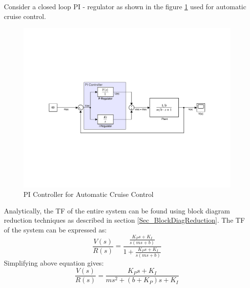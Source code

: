 Consider a closed loop PI - regulator as shown in the figure \ref{Fig_PI_Control_CruiseControl} used for automatic cruise control.
\begin{figure}[h!]
	\centering
	\includegraphics[width=\linewidth]{Bilder/Cruise_Control_PI_Control.pdf}
	\caption{PI Controller for Automatic Cruise Control}
	\label{Fig_PI_Control_CruiseControl}
\end{figure}
\newpage
Analytically, the TF of the entire system can be found using block diagram reduction techniques as described in section \ref{Sec_BlockDiagReduction}. The TF of the system can be expressed as:
\begin{equation}
	\frac{V(s)}{R(s)} = \frac{\frac{K_P s + K_I}{s(ms + b)}}{1 + \frac{K_P s + K_I}{s(ms + b)}}
\end{equation}
Simplifying above equation gives:
\begin{equation} \label{Eq_Random10}
	\frac{V(s)}{R(s)} = \frac{K_P s + K_I}{m s^2 + (b + K_P)s + K_I}
\end{equation}

